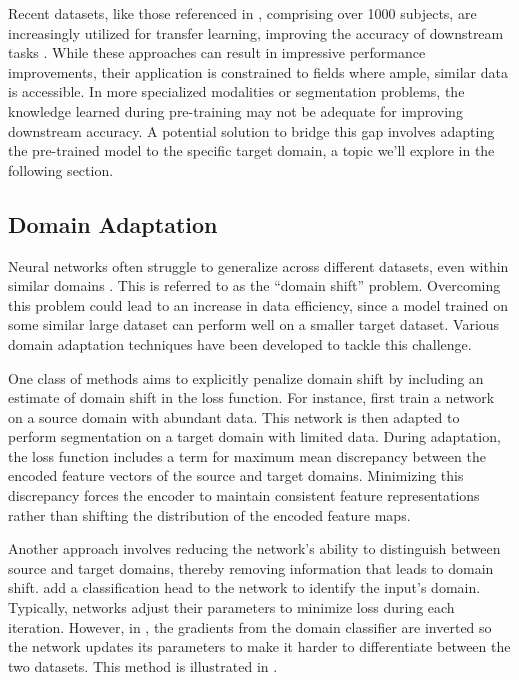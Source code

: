 Recent datasets, like those referenced in \cite{wasserthalTotalSegmentatorRobustSegmentation2023}, comprising over 1000 subjects, are increasingly utilized for transfer learning, improving the accuracy of downstream tasks \cite{monaiconsortiumMONAIMedicalOpen2023, myronenkoAutomated3DSegmentation2023}. While these approaches can result in impressive performance improvements, their application is constrained to fields where ample, similar data is accessible. In more specialized modalities or segmentation problems, the knowledge learned during pre-training may not be adequate for improving downstream accuracy.  A potential solution to bridge this gap involves adapting the pre-trained model to the specific target domain, a topic we'll explore in the following section.

	\subsection{Domain Adaptation}
	
Neural networks often struggle to generalize across different datasets, even within similar domains \cite{torralbaUnbiasedLookDataset2011}. This is referred to as the ``domain shift'' problem. Overcoming this problem could lead to an increase in data efficiency, since a model trained on some similar large dataset can perform well on a smaller target dataset. Various domain adaptation techniques have been developed to tackle this challenge.

One class of methods aims to explicitly penalize domain shift by including an estimate of domain shift in the loss function. For instance, \citet{liuUnsupervisedDeepDomain2018} first train a network on a source domain with abundant data. This network is then adapted to perform segmentation on a target domain with limited data. During adaptation, the loss function includes a term for maximum mean discrepancy between the encoded feature vectors of the source and target domains. Minimizing this discrepancy forces the encoder to maintain consistent feature representations rather than shifting the distribution of the encoded feature maps.

Another approach involves reducing the network's ability to distinguish between source and target domains, thereby removing information that leads to domain shift. \citet{ganinDA2015} add a classification head to the network to identify the input's domain. Typically, networks adjust their parameters to minimize loss during each iteration. However, in \cite{ganinDA2015}, the gradients from the domain classifier are inverted so the network updates its parameters to make it harder to differentiate between the two datasets. This method is illustrated in .

